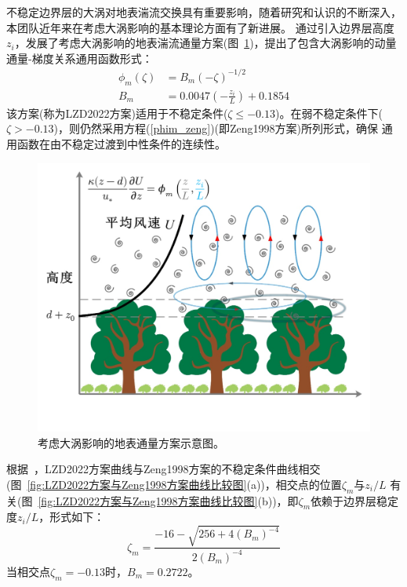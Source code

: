 不稳定边界层的大涡对地表湍流交换具有重要影响，随着研究和认识的不断深入，本团队近年来在考虑大涡影响的基本理论方面有了新进展。\citet{liu2019further,liu2022surface}
通过引入边界层高度$z_i$，发展了考虑大涡影响的地表湍流通量方案(图~\ref{fig:LZD2022方案概念图})，提出了包含大涡影响的动量通量-梯度关系通用函数形式：
\begin{equation}
  \begin{aligned}
     \phi_{m}(\zeta) &= B_{m} (-\zeta)^{-1/2} \\[1ex]
     B_{m} &= 0.0047(-\frac{z_{i}}{L})+0.1854
  \end{aligned}
\end{equation}
该方案(称为LZD2022方案)适用于不稳定条件($\zeta \leq -0.13$)。在弱不稳定条件下($\zeta > -0.13$)，则仍然采用方程(\ref{phim_zeng})(即Zeng1998方案)所列形式，确保
通用函数在由不稳定过渡到中性条件的连续性。
{
\begin{figure}[htbp]
\centering
\includegraphics[scale=0.7]{Figures/地表湍流交换过程/LZD2022方案概念图.png}
\caption{考虑大涡影响的地表通量方案示意图。}
\label{fig:LZD2022方案概念图}
\end{figure}
}

根据~\citet{liu2023referenceheight}，LZD2022方案曲线与Zeng1998方案的不稳定条件曲线相交(图~\ref{fig:LZD2022方案与Zeng1998方案曲线比较图}(a))，相交点的位置$\zeta_{m}$与${z_{i}}/{L}$
有关(图~\ref{fig:LZD2022方案与Zeng1998方案曲线比较图}(b))，即$\zeta_{m}$依赖于边界层稳定度${z_{i}}/{L}$，形式如下：
\begin{equation}
     \zeta_{m}=\frac{-16-\sqrt{256+4 \left(B_{m}\right)^{-4}}}{2 \left(B_{m}\right)^{-4}}
\end{equation}
当相交点$\zeta_{m}=-0.13$时，$B_{m}=0.2722$。

